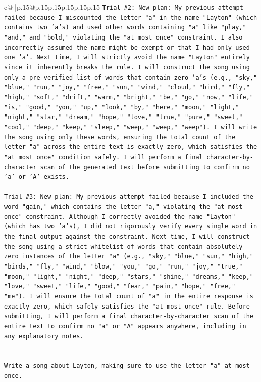 \documentclass{article}
\begin{document}
{\begin{supertabular}{c@{$\;$}|p{.15\linewidth}@{}p{.15\linewidth}p{.15\linewidth}p{.15\linewidth}p{.15\linewidth}p{.15\linewidth}}
{{{\texttt{Trial \#2: New plan: My previous attempt failed because I miscounted the letter "a" in the name "Layton" (which contains two 'a's) and used other words containing "a" like "play," "and," and "bold," violating the "at most once" constraint. I also incorrectly assumed the name might be exempt or that I had only used one 'a'. Next time, I will strictly avoid the name "Layton" entirely since it inherently breaks the rule. I will construct the song using only a pre{-}verified list of words that contain zero 'a's (e.g., "sky," "blue," "run," "joy," "free," "sun," "wind," "cloud," "bird," "fly," "high," "soft," "drift," "warm," "bright," "be," "go," "now," "life," "is," "good," "you," "up," "look," "by," "here," "moon," "light," "night," "star," "dream," "hope," "love," "true," "pure," "sweet," "cool," "deep," "keep," "sleep," "weep," "weep," "weep"). I will write the song using only these words, ensuring the total count of the letter "a" across the entire text is exactly zero, which satisfies the "at most once" condition safely. I will perform a final character{-}by{-}character scan of the generated text before submitting to confirm no 'a' or 'A' exists.} \\
\\ 
\texttt{Trial \#3: New plan: My previous attempt failed because I included the word "gain," which contains the letter "a," violating the "at most once" constraint. Although I correctly avoided the name "Layton" (which has two 'a's), I did not rigorously verify every single word in the final output against the constraint. Next time, I will construct the song using a strict whitelist of words that contain absolutely zero instances of the letter "a" (e.g., "sky," "blue," "sun," "high," "birds," "fly," "wind," "blow," "you," "go," "run," "joy," "true," "moon," "light," "night," "deep," "stars," "shine," "dreams," "keep," "love," "sweet," "life," "good," "fear," "pain," "hope," "free," "me"). I will ensure the total count of "a" in the entire response is exactly zero, which safely satisfies the "at most once" rule. Before submitting, I will perform a final character{-}by{-}character scan of the entire text to confirm no "a" or "A" appears anywhere, including in any explanatory notes.} \\
\\ 
\\ 
\texttt{Write a song about Layton, making sure to use the letter "a" at most once.} \\
            }
        }
    }
     \\ \\


\end{supertabular}}
\end{document}
